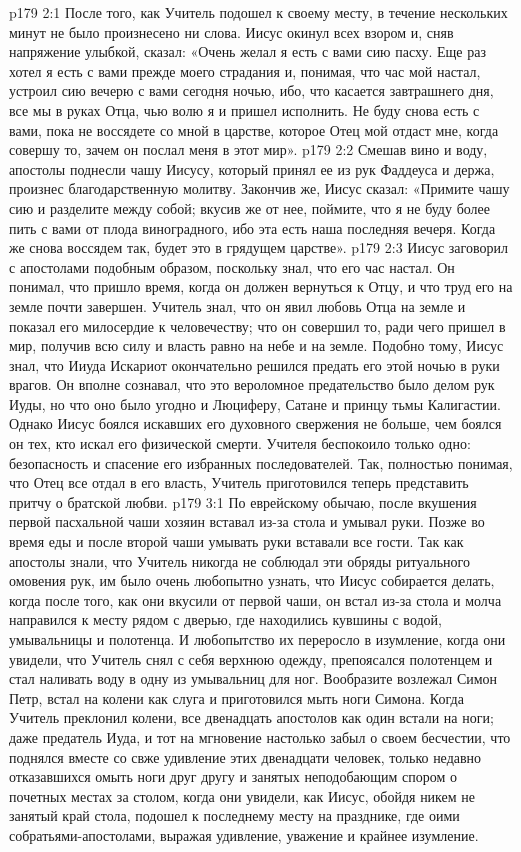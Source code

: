 \vs p179 2:1 После того, как Учитель подошел к своему месту, в течение нескольких минут не было произнесено ни слова. Иисус окинул всех взором и, сняв напряжение улыбкой, сказал: «Очень желал я есть с вами сию пасху. Еще раз хотел я есть с вами прежде моего страдания и, понимая, что час мой настал, устроил сию вечерю с вами сегодня ночью, ибо, что касается завтрашнего дня, все мы в руках Отца, чью волю я и пришел исполнить. Не буду снова есть с вами, пока не воссядете со мной в царстве, которое Отец мой отдаст мне, когда совершу то, зачем он послал меня в этот мир».
\vs p179 2:2 Смешав вино и воду, апостолы поднесли чашу Иисусу, который принял ее из рук Фаддеуса и держа, произнес благодарственную молитву. Закончив же, Иисус сказал: «Примите чашу сию и разделите между собой; вкусив же от нее, поймите, что я не буду более пить с вами от плода виноградного, ибо эта есть наша последняя вечеря. Когда же снова воссядем так, будет это в грядущем царстве».
\vs p179 2:3 Иисус заговорил с апостолами подобным образом, поскольку знал, что его час настал. Он понимал, что пришло время, когда он должен вернуться к Отцу, и что труд его на земле почти завершен. Учитель знал, что он явил любовь Отца на земле и показал его милосердие к человечеству; что он совершил то, ради чего пришел в мир, получив всю силу и власть равно на небе и на земле. Подобно тому, Иисус знал, что Ииуда Искариот окончательно решился предать его этой ночью в руки врагов. Он вполне сознавал, что это вероломное предательство было делом рук Иуды, но что оно было угодно и Люциферу, Сатане и принцу тьмы Калигастии. Однако Иисус боялся искавших его духовного свержения не больше, чем боялся он тех, кто искал его физической смерти. Учителя беспокоило только одно: безопасность и спасение его избранных последователей. Так, полностью понимая, что Отец все отдал в его власть, Учитель приготовился теперь представить притчу о братской любви.
\vs p179 3:1 По еврейскому обычаю, после вкушения первой пасхальной чаши хозяин вставал из\hyp{}за стола и умывал руки. Позже во время еды и после второй чаши умывать руки вставали все гости. Так как апостолы знали, что Учитель никогда не соблюдал эти обряды ритуального омовения рук, им было очень любопытно узнать, что Иисус собирается делать, когда после того, как они вкусили от первой чаши, он встал из\hyp{}за стола и молча направился к месту рядом с дверью, где находились кувшины с водой, умывальницы и полотенца. И любопытство их переросло в изумление, когда они увидели, что Учитель снял с себя верхнюю одежду, препоясался полотенцем и стал наливать воду в одну из умывальниц для ног. Вообразите возлежал Симон Петр, встал на колени как слуга и приготовился мыть ноги Симона. Когда Учитель преклонил колени, все двенадцать апостолов как один встали на ноги; даже предатель Иуда, и тот на мгновение настолько забыл о своем бесчестии, что поднялся вместе со свже удивление этих двенадцати человек, только недавно отказавшихся омыть ноги друг другу и занятых неподобающим спором о почетных местах за столом, когда они увидели, как Иисус, обойдя никем не занятый край стола, подошел к последнему месту на празднике, где оими собратьями\hyp{}апостолами, выражая удивление, уважение и крайнее изумление.
